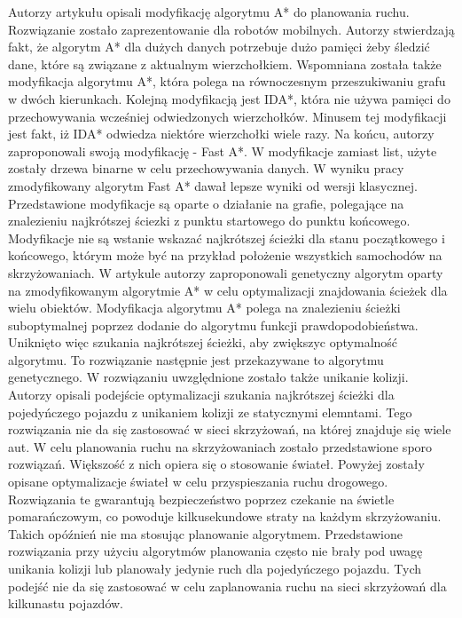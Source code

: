 \indent
Autorzy artykułu \cite{munteanmobile} opisali modyfikację algorytmu A* do planowania ruchu. Rozwiązanie zostało zaprezentowanie dla robotów mobilnych. Autorzy stwierdzają fakt, że algorytm A* dla dużych danych potrzebuje dużo pamięci żeby śledzić dane, które są związane z aktualnym wierzchołkiem. Wspomniana została także modyfikacja algorytmu A*, która polega na równoczesnym przeszukiwaniu grafu w dwóch kierunkach. Kolejną modyfikacją jest IDA*, która nie używa pamięci do przechowywania wcześniej odwiedzonych wierzchołków. Minusem tej modyfikacji jest fakt, iż IDA* odwiedza niektóre wierzchołki wiele razy. Na końcu, autorzy zaproponowali swoją modyfikację - Fast A*. W modyfikacje zamiast list, użyte zostały drzewa binarne w celu przechowywania danych. W wyniku pracy zmodyfikowany algorytm Fast A* dawał lepsze wyniki od wersji klasycznej. Przedstawione modyfikacje są oparte o działanie na grafie, polegające na znalezieniu najkrótszej ściezki z punktu startowego do punktu końcowego. Modyfikacje nie są wstanie wskazać najkrótszej ścieżki dla stanu początkowego i końcowego, którym może być na przykład położenie wszystkich samochodów na skrzyżowaniach.
\newline
\indent
W artykule \cite{oleiwi2014modified} autorzy zaproponowali genetyczny algorytm oparty na zmodyfikowanym algorytmie A* w celu optymalizacji znajdowania ścieżek dla wielu obiektów. Modyfikacja algorytmu A* polega na znalezieniu ścieżki suboptymalnej poprzez dodanie do algorytmu funkcji prawdopodobieństwa. Uniknięto więc szukania najkrótszej ścieżki, aby zwiększyc optymalność algorytmu. To rozwiązanie następnie jest przekazywane to algorytmu genetycznego. W rozwiązaniu uwzględnione zostało także unikanie kolizji. Autorzy opisali podejście optymalizacji szukania najkrótszej ścieżki dla pojedyńczego pojazdu z unikaniem kolizji ze statycznymi elemntami. Tego rozwiązania nie da się zastosować w sieci skrzyżowań, na której znajduje się wiele aut.
\newline
\indent
W celu planowania ruchu na skrzyżowaniach zostało przedstawione sporo rozwiązań. Większość z nich opiera się o stosowanie świateł. Powyżej zostały opisane optymalizacje świateł w celu przyspieszania ruchu drogowego. Rozwiązania te gwarantują bezpieczeństwo poprzez czekanie na świetle pomarańczowym, co powoduje kilkusekundowe straty na każdym skrzyżowaniu. Takich opóźnień nie ma stosując planowanie algorytmem. Przedstawione rozwiązania przy użyciu algorytmów planowania często nie brały pod uwagę unikania kolizji lub planowały jedynie ruch dla pojedyńczego pojazdu. Tych podejść nie da się zastosować w celu zaplanowania ruchu na sieci skrzyżowań dla kilkunastu pojazdów.
